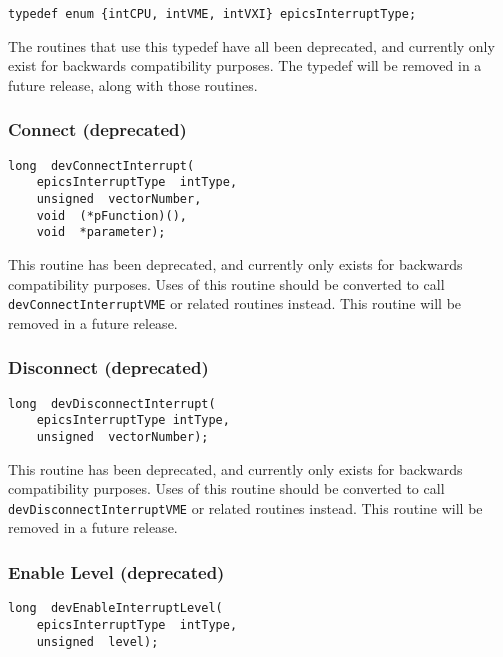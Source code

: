 \begin{verbatim}
typedef enum {intCPU, intVME, intVXI} epicsInterruptType;
\end{verbatim}

The routines that use this typedef have all been deprecated, and currently only exist for backwards compatibility purposes. 
The typedef will be removed in a future release, along with those routines.

\subsubsection{Connect (deprecated)}

\begin{verbatim}
long  devConnectInterrupt(
    epicsInterruptType  intType,
    unsigned  vectorNumber,
    void  (*pFunction)(),
    void  *parameter);
\end{verbatim}

This routine has been deprecated, and currently only exists for backwards compatibility purposes. Uses of this routine 
should be converted to call \verb|devConnectInterruptVME| or related routines instead. This routine will be removed in a 
future release.

\subsubsection{Disconnect (deprecated)}

\begin{verbatim}
long  devDisconnectInterrupt(
    epicsInterruptType intType,
    unsigned  vectorNumber);
\end{verbatim}

This routine has been deprecated, and currently only exists for backwards compatibility purposes. Uses of this routine 
should be converted to call \verb|devDisconnectInterruptVME| or related routines instead. This routine will be removed 
in a future release.

\subsubsection{Enable Level (deprecated)}

\begin{verbatim}
long  devEnableInterruptLevel(
    epicsInterruptType  intType,
    unsigned  level);
\end{verbatim}

